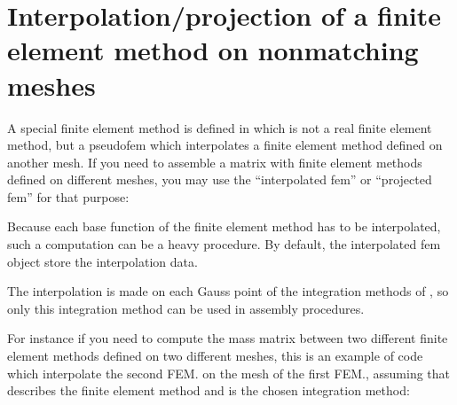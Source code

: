 \documentclass[a4paper,11pt,english]{sphinxmanual}
\begin{document}
\chapter{Interpolation/projection of a finite element method on non\sphinxhyphen{}matching meshes}
\label{\detokenize{userdoc/interNMM:interpolation-projection-of-a-finite-element-method-on-non-matching-meshes}}\label{\detokenize{userdoc/interNMM:ud-internmm}}\label{\detokenize{userdoc/interNMM::doc}}
A special finite element method is defined in
 which is not a real finite element
method, but a pseudo\sphinxhyphen{}fem which interpolates a finite element method defined on
another mesh. If you need to assemble a matrix with finite element methods
defined on different meshes, you may use the “interpolated fem” or “projected
fem” for that purpose:

\begin{sphinxVerbatim}[commandchars=\\\{\}]
   
   
\end{sphinxVerbatim}

Because each base function of the finite element method has to be interpolated,
such a computation can be a heavy procedure. By default, the interpolated fem
object store the interpolation data.

The interpolation is made on each Gauss point of the integration methods of
, so only this integration method can be used in assembly
procedures.

For instance if you need to compute the mass matrix between two different finite
element methods defined on two different meshes, this is an example of code which
interpolate the second FEM. on the mesh of the first FEM., assuming that 
describes the finite element method and  is the chosen integration method:
\end{document}
